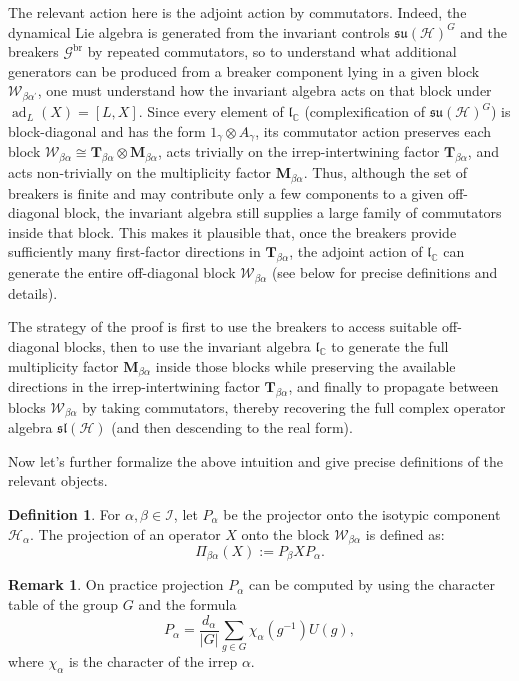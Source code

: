 \documentclass[11pt,letterpaper]{article}
\newcounter{alg}
\theoremstyle{plain}
\theoremstyle{plain}
\theoremstyle{plain}
\theoremstyle{plain}
\theoremstyle{plain}
\theoremstyle{plain}
\newcommand{\C}{\mathbb{C}}
\newcommand{\HH}{\mathcal{H}}
\theoremstyle{plain}
\theoremstyle{definition}
\newtheorem{smdefinition}[smtheorem]{Definition}
\newtheorem{smremark}[smtheorem]{Remark}
\theoremstyle{plain}
\begin{document}
The relevant action here is the adjoint action by commutators. 
Indeed, the dynamical Lie algebra is generated from the invariant controls $\mathfrak{su}(\HH)^G$ and the breakers
$\mathcal{G}^{\text{br}}$ by repeated commutators, so to understand what additional generators can be produced 
from a breaker component lying in a given block $\mathcal{W}_{\beta \alpha^{\prime}}$, one must understand how the invariant algebra 
acts on that block under $\operatorname{ad}_L(X)=[L, X]$. Since every element of $\mathfrak{l}_{\C}$ (complexification of $\mathfrak{su}(\HH)^G$) is block-diagonal and has the form $\mathrm{1}_{\gamma} \otimes A_\gamma$, 
its commutator action preserves each block $\mathcal{W}_{\beta \alpha} \cong \mathbf{T}_{\beta \alpha} \otimes \mathbf{M}_{\beta \alpha}$, 
acts trivially on the irrep-intertwining factor $\mathbf{T}_{\beta \alpha}$, and acts non-trivially on the multiplicity factor $\mathbf{M}_{\beta \alpha}$. Thus, although the set of breakers is finite and may contribute only a few components to a given off-diagonal block, 
the invariant algebra still supplies a large family of commutators inside that block. This makes it plausible that, once the breakers provide sufficiently many first-factor directions in $\mathbf{T}_{\beta \alpha}$, the adjoint action of $\mathfrak{l}_{\C}$ 
can generate the entire off-diagonal block $\mathcal{W}_{\beta \alpha}$ (see below for precise definitions and details).

The strategy of the proof is first to use the breakers to access suitable off-diagonal blocks, then to use the invariant algebra $\mathfrak{l}_\C$ to generate the full multiplicity factor $\mathbf{M}_{\beta \alpha}$ 
inside those blocks while preserving the available directions in the irrep-intertwining factor $\mathbf{T}_{\beta \alpha}$, and finally to propagate between blocks $\mathcal{W}_{\beta \alpha}$ by taking commutators, 
thereby recovering the full complex operator algebra $\mathfrak{sl}(\HH)$ (and then descending to the real form).

Now let's further formalize the above intuition and give precise definitions of the relevant objects.
\begin{smdefinition}\label{def:projection_onto_block}
    For $\alpha, \beta \in \mathcal{I}$, let $P_\alpha$ be the projector onto the isotypic component $\HH_\alpha$. The projection of an operator $X$ onto the block $\mathcal{W}_{\beta\alpha}$ is defined as:
    \begin{equation*}
        \Pi_{\beta\alpha}(X) := P_\beta X P_\alpha.
    \end{equation*}
\end{smdefinition}
\begin{smremark}
    On practice projection $P_{\alpha}$ can be computed by using the character table of the group $G$ and the formula
    \begin{equation*}\label{eq:projector_formula}
        P_\alpha=\frac{d_\alpha}{|G|} \sum_{g \in G} \chi_\alpha\left(g^{-1}\right) U(g),
    \end{equation*}
    where $\chi_\alpha$ is the character of the irrep $\alpha$. 
\end{smremark}
\end{document}
